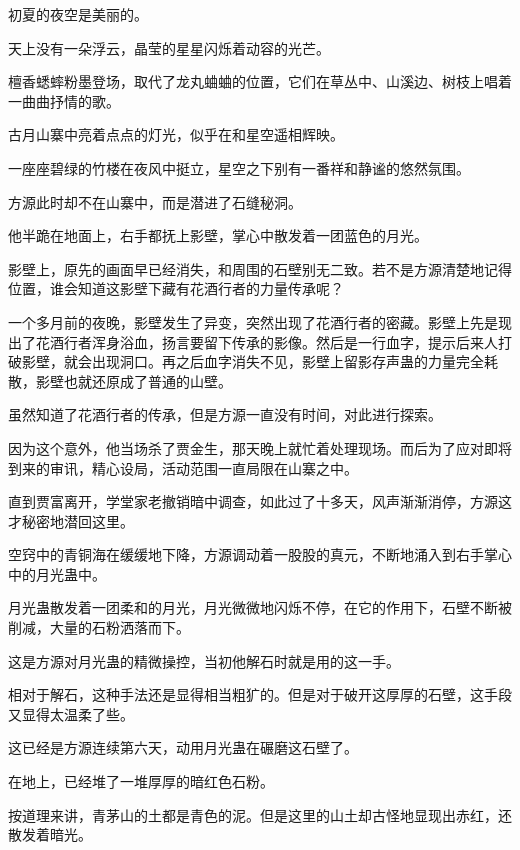 
\begin{this_body}

初夏的夜空是美丽的。

天上没有一朵浮云，晶莹的星星闪烁着动容的光芒。

檀香蟋蟀粉墨登场，取代了龙丸蛐蛐的位置，它们在草丛中、山溪边、树枝上唱着一曲曲抒情的歌。

古月山寨中亮着点点的灯光，似乎在和星空遥相辉映。

一座座碧绿的竹楼在夜风中挺立，星空之下别有一番祥和静谧的悠然氛围。

方源此时却不在山寨中，而是潜进了石缝秘洞。

他半跪在地面上，右手都抚上影壁，掌心中散发着一团蓝色的月光。

影壁上，原先的画面早已经消失，和周围的石壁别无二致。若不是方源清楚地记得位置，谁会知道这影壁下藏有花酒行者的力量传承呢？

一个多月前的夜晚，影壁发生了异变，突然出现了花酒行者的密藏。影壁上先是现出了花酒行者浑身浴血，扬言要留下传承的影像。然后是一行血字，提示后来人打破影壁，就会出现洞口。再之后血字消失不见，影壁上留影存声蛊的力量完全耗散，影壁也就还原成了普通的山壁。

虽然知道了花酒行者的传承，但是方源一直没有时间，对此进行探索。

因为这个意外，他当场杀了贾金生，那天晚上就忙着处理现场。而后为了应对即将到来的审讯，精心设局，活动范围一直局限在山寨之中。

直到贾富离开，学堂家老撤销暗中调查，如此过了十多天，风声渐渐消停，方源这才秘密地潜回这里。

空窍中的青铜海在缓缓地下降，方源调动着一股股的真元，不断地涌入到右手掌心中的月光蛊中。

月光蛊散发着一团柔和的月光，月光微微地闪烁不停，在它的作用下，石壁不断被削减，大量的石粉洒落而下。

这是方源对月光蛊的精微操控，当初他解石时就是用的这一手。

相对于解石，这种手法还是显得相当粗犷的。但是对于破开这厚厚的石壁，这手段又显得太温柔了些。

这已经是方源连续第六天，动用月光蛊在碾磨这石壁了。

在地上，已经堆了一堆厚厚的暗红色石粉。

按道理来讲，青茅山的土都是青色的泥。但是这里的山土却古怪地显现出赤红，还散发着暗光。


\end{this_body}
